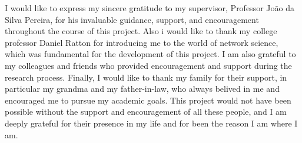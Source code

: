 
I would like to express my sincere gratitude to my supervisor, Professor João da Silva Pereira, for his invaluable guidance,
support, and encouragement throughout the course of this project. Also i would like to thank my college professor Daniel Ratton for introducing me to the world of 
network science, which was fundamental for the development of this project. I am also grateful to my colleagues and friends who provided encouragement and support during the research process.
Finally, I would like to thank my family for their support, in particular my grandma and my father-in-law, who always belived in me and encouraged me to pursue my academic goals.
This project would not have been possible without the support and encouragement of all these people, and I am deeply grateful for their presence in my life and for been the reason I am where I am.

\MediaOptionLogicBlank